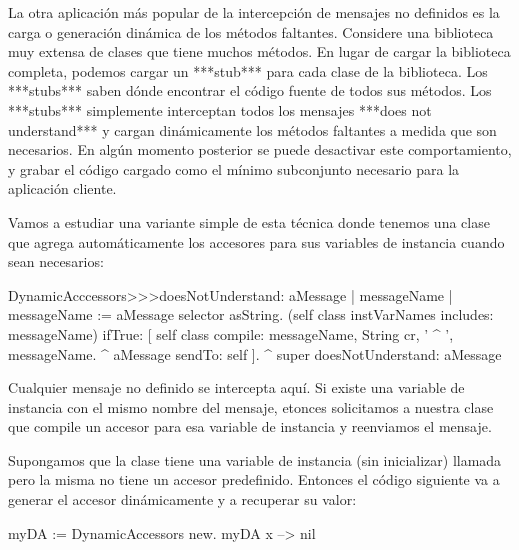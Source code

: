 \documentclass[a4paper,10pt,twoside]{book}
\begin{document}
La otra aplicación más popular de la intercepción de mensajes no
definidos es la carga o generación dinámica de los métodos faltantes.
Considere una biblioteca muy extensa de clases que tiene muchos
métodos.  En lugar de cargar la biblioteca completa, podemos cargar un
***stub*** para cada clase de la biblioteca.  Los ***stubs*** saben
dónde encontrar el código fuente de todos sus métodos.  Los
***stubs*** simplemente interceptan todos los mensajes ***does not
understand*** y cargan dinámicamente los métodos faltantes a medida
que son necesarios.  En algún momento posterior se puede desactivar
este comportamiento, y grabar el código cargado como el mínimo
subconjunto necesario para la aplicación cliente.


Vamos a estudiar una variante simple de esta técnica donde tenemos una
clase que agrega automáticamente los accesores para sus variables de
instancia cuando sean necesarios:

\begin{code}{}
DynamicAcccessors>>>doesNotUnderstand: aMessage
        | messageName |
        messageName := aMessage selector asString.
        (self class instVarNames includes: messageName)
                ifTrue: [
                        self class compile: messageName, String cr, ' ^ ', messageName.
                        ^ aMessage sendTo: self ].
        ^ super doesNotUnderstand: aMessage
\end{code}
Cualquier mensaje no definido se intercepta aquí.  Si existe una
variable de instancia con el mismo nombre del mensaje, etonces
solicitamos a nuestra clase que compile un accesor para esa variable
de instancia y reenviamos el mensaje.

Supongamos que la clase  tiene una variable de
instancia (sin inicializar) llamada  pero la misma no tiene un
accesor predefinido.  Entonces el código siguiente va a generar el
accesor dinámicamente y a recuperar su valor:
\begin{code}{}
myDA := DynamicAccessors new.
myDA x --> nil
\end{code}
\end{document}
